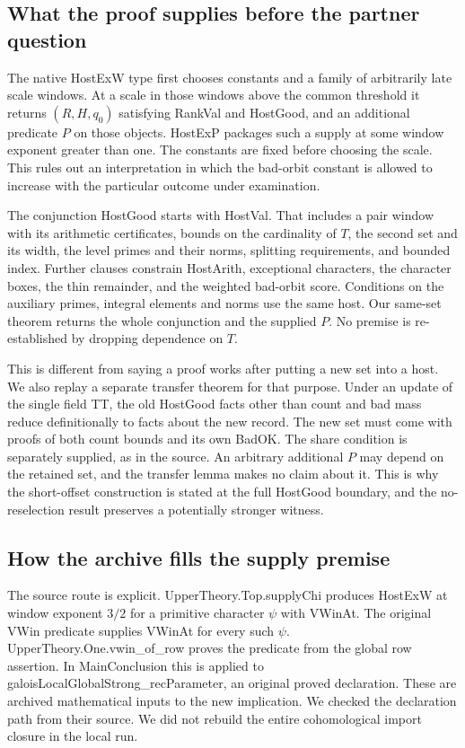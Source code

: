 \documentclass[12pt,letterpaper]{article}
\DeclareRobustCommand{\id}[1]{\mbox{\small\ttfamily #1}}
\begin{document}
\subsection{What the proof supplies before the partner question}

The native \id{HostExW} type first chooses constants and a family of arbitrarily late scale windows. At a scale in those windows above the common threshold it returns \((R,H,q_0)\) satisfying \id{RankVal} and \id{HostGood}, and an additional predicate \(P\) on those objects. \id{HostExP} packages such a supply at some window exponent greater than one. The constants are fixed before choosing the scale. This rules out an interpretation in which the bad-orbit constant is allowed to increase with the particular outcome under examination.

The conjunction \id{HostGood} starts with \id{HostVal}. That includes a pair window with its arithmetic certificates, bounds on the cardinality of \(T\), the second set and its width, the level primes and their norms, splitting requirements, and bounded index. Further clauses constrain \id{HostArith}, exceptional characters, the character boxes, the thin remainder, and the weighted bad-orbit score. Conditions on the auxiliary primes, integral elements and norms use the same host. Our same-set theorem returns the whole conjunction and the supplied \(P\). No premise is re-established by dropping dependence on \(T\).

This is different from saying a proof works after putting a new set into a host. We also replay a separate transfer theorem for that purpose. Under an update of the single field \id{TT}, the old \id{HostGood} facts other than count and bad mass reduce definitionally to facts about the new record. The new set must come with proofs of both count bounds and its own \id{BadOK}. The share condition is separately supplied, as in the source. An arbitrary additional \(P\) may depend on the retained set, and the transfer lemma makes no claim about it. This is why the short-offset construction is stated at the full \id{HostGood} boundary, and the no-reselection result preserves a potentially stronger witness.

\subsection{How the archive fills the supply premise}

The source route is explicit. \id{UpperTheory.Top.supplyChi} produces \id{HostExW} at window exponent \(3/2\) for a primitive character \(\psi\) with \id{VWinAt}. The original \id{VWin} predicate supplies \id{VWinAt} for every such \(\psi\). \id{UpperTheory.One.vwin\_of\_row} proves the predicate from the global row assertion. In \id{MainConclusion} this is applied to \id{galoisLocalGlobalStrong\_recParameter}, an original proved declaration. These are archived mathematical inputs to the new implication. We checked the declaration path from their source. We did not rebuild the entire cohomological import closure in the local run.
\end{document}
